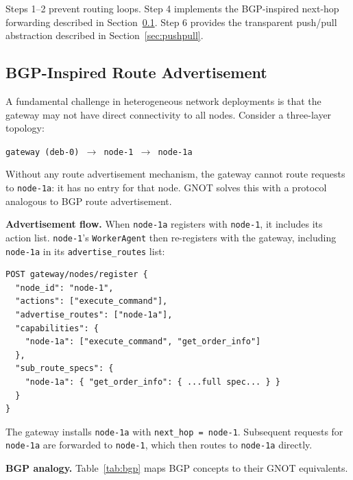 \documentclass[10pt,twocolumn]{article}
\begin{document}
Steps 1--2 prevent routing loops. Step 4 implements the BGP-inspired
next-hop forwarding described in Section~\ref{sec:bgp}. Step 6 provides
the transparent push/pull abstraction described in
Section~\ref{sec:pushpull}.

\subsection{BGP-Inspired Route Advertisement}
\label{sec:bgp}

A fundamental challenge in heterogeneous network deployments is that the
gateway may not have direct connectivity to all nodes. Consider a
three-layer topology:

\begin{center}
\texttt{gateway (deb-0) $\to$ node-1 $\to$ node-1a}
\end{center}

Without any route advertisement mechanism, the gateway cannot route
requests to \texttt{node-1a}: it has no entry for that node. GNOT
solves this with a protocol analogous to BGP route advertisement.

\textbf{Advertisement flow.} When \texttt{node-1a} registers with
\texttt{node-1}, it includes its action list. \texttt{node-1}'s
\texttt{WorkerAgent} then re-registers with the gateway, including
\texttt{node-1a} in its \texttt{advertise\_routes} list:

\begin{lstlisting}[caption={Re-registration with route advertisement}]
POST gateway/nodes/register {
  "node_id": "node-1",
  "actions": ["execute_command"],
  "advertise_routes": ["node-1a"],
  "capabilities": {
    "node-1a": ["execute_command", "get_order_info"]
  },
  "sub_route_specs": {
    "node-1a": { "get_order_info": { ...full spec... } }
  }
}
\end{lstlisting}

The gateway installs \texttt{node-1a} with \texttt{next\_hop = node-1}.
Subsequent requests for \texttt{node-1a} are forwarded to \texttt{node-1},
which then routes to \texttt{node-1a} directly.

\textbf{BGP analogy.} Table~\ref{tab:bgp} maps BGP concepts to their
GNOT equivalents.
\end{document}
